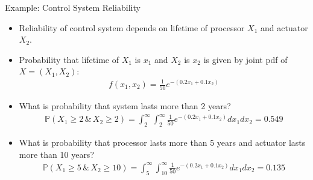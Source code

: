 \documentclass[9pt]{beamer}
\begin{document}
%
\begin{frame}{Example: Control System Reliability}

\begin{itemize}
\setlength{\itemsep}{10pt}
\item Reliability of control system depends on lifetime of processor $X_1$ and actuator $X_2$.
\item Probability that lifetime of $X_1$  is $x_1$ and $X_2$ is $x_2$ is given by joint pdf of $X=(X_1,X_2)$:
\begin{align*}
f(x_1,x_2)=\frac{1}{50}e^{-(0.2x_1+0.1x_2)}
\end{align*} 
\item What is probability that system lasts more than 2 years?
\begin{align*}
\mathbb{P}(X_1\geq 2\,\&\,X_2\geq 2)=\int_{2}^{\infty}\int_{2}^{\infty}\frac{1}{50}e^{-(0.2x_1+0.1x_2)}dx_1dx_2=0.549
\end{align*}
\item What is probability that processor lasts more than 5 years and actuator lasts more than 10 years?
\begin{align*}
\mathbb{P}(X_1\geq 5\,\&\,X_2\geq 10)=\int_{5}^{\infty}\int_{10}^{\infty}\frac{1}{50}e^{-(0.2x_1+0.1x_2)}dx_1dx_2=0.135
\end{align*}
\end{itemize}

\end{frame}
\end{document}
